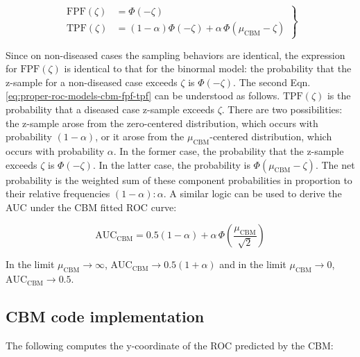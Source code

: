 \documentclass[
]{book}
\begin{document}
\begin{equation}
\left.\begin{aligned}
\text{FPF}\left( \zeta \right) &= \Phi\left( -\zeta \right)\\
\text{TPF}\left( \zeta \right) &= \left( 1-\alpha \right)\Phi\left( -\zeta \right)+\alpha \,\Phi\left( \mu_\text{CBM}-\zeta \right)
\end{aligned}\right\}
\label{eq:proper-roc-models-cbm-fpf-tpf}
\end{equation}

Since on non-diseased cases the sampling behaviors are identical, the expression for \(\text{FPF}\left( \zeta \right)\) is identical to that for the binormal model: the probability that the z-sample for a non-diseased case exceeds \(\zeta\) is \(\Phi\left( -\zeta \right)\). The second Eqn. \eqref{eq:proper-roc-models-cbm-fpf-tpf} can be understood as follows. \(\text{TPF}\left( \zeta \right)\) is the probability that a diseased case z-sample exceeds \(\zeta\). There are two possibilities: the z-sample arose from the zero-centered distribution, which occurs with probability \(\left( 1-\alpha \right)\), or it arose from the \(\mu_\text{CBM}\)-centered distribution, which occurs with probability \(\alpha\). In the former case, the probability that the z-sample exceeds \(\zeta\) is \(\Phi\left( -\zeta \right)\). In the latter case, the probability is \(\Phi\left( \mu_\text{CBM}-\zeta \right)\). The net probability is the weighted sum of these component probabilities in proportion to their relative frequencies \(\left( 1-\alpha \right):\alpha\). A similar logic can be used to derive the AUC under the CBM fitted ROC curve:

\begin{equation}
\text{AUC}_\text{CBM}=0.5\left( 1-\alpha \right)+\alpha \,\Phi\left( \frac {\mu_\text{CBM}}{\sqrt{2}} \right)
\label{eq:proper-roc-models-cbm-auc}
\end{equation}

In the limit \(\mu_\text{CBM} \rightarrow \infty\), \(\text{AUC}_\text{CBM} \rightarrow 0.5\left( 1+\alpha \right)\) and in the limit \(\mu_\text{CBM} \rightarrow 0\), \(\text{AUC}_\text{CBM} \rightarrow 0.5\).

\hypertarget{proper-roc-models-cbm-code}{%
\subsection{CBM code implementation}\label{proper-roc-models-cbm-code}}

The following computes the y-coordinate of the ROC predicted by the CBM:
\end{document}
